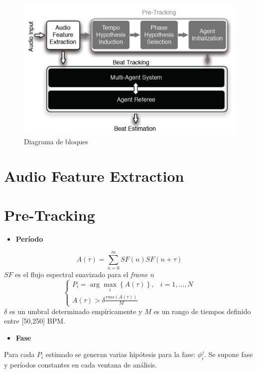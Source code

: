 \documentclass[12pt,a4paper,titlepage]{report}
\begin{document}
\begin{figure}[h!]
\centering
\includegraphics[width=.6\linewidth]{./pics/bloques}
\caption{Diagrama de bloques}
\label{fig:bloques}
\end{figure}

\section*{Audio Feature Extraction}

\section*{Pre-Tracking}

\vspace*{15pt}
	\begin{itemize} \item \textbf{Período} \end{itemize}
	\begin{equation*}
		A(\tau) = \sum\limits_{n=0}^{m}SF(n)SF(n+\tau)
		\label{ec:autocorrelacion}
	\end{equation*}
	$SF$ es el flujo espectral suavizado para el \emph{frame} $n$
	\begin{equation*}
		\begin{cases}
		P_i = \arg\max_i \left\{ A(\tau) \right\}, & i=1,\dots, N\\
		A(\tau)>\delta \frac{rms(A(\tau))}{M} & 
		\end{cases}
		\label{ec:period}
	\end{equation*}
$\delta$ es un umbral determinado empíricamente y $M$ es un rango de tiempos definido entre [50,250] BPM.

\begin{itemize} \item \textbf{Fase} \end{itemize}
Para cada $P_i$ estimado se generan varias hipótesis para la fase: $\phi_i^j$. Se supone fase y períodos constantes en cada ventana de análisis.\\
\end{document}
